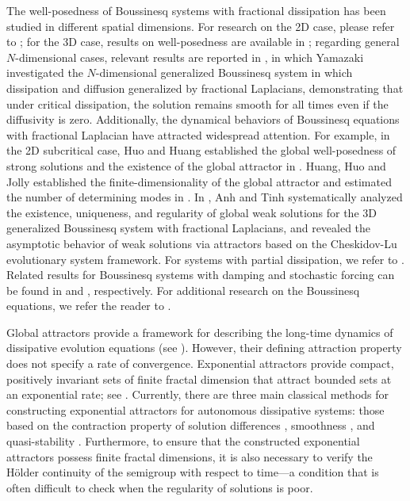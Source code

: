 \documentclass[oneside,preprint,12pt,numbers,sort&compress]{elsarticle}
\begin{document}
The well-posedness of Boussinesq systems with fractional
dissipation has been studied in different spatial dimensions. For research on the 2D case, please refer to \cite{YX2016,DYZ2020}; for the 3D case, results on well-posedness are available in \cite{BF2017,YJW2018,LY2021,XZ2024}; regarding general $N$-dimensional cases, relevant results are reported in \cite{Yamazaki2015}, in which Yamazaki investigated the $N$-dimensional generalized Boussinesq system in which dissipation and diffusion generalized by fractional Laplacians, demonstrating that under critical dissipation, the solution remains smooth for all times even if the diffusivity is zero. Additionally, the dynamical behaviors of Boussinesq equations with fractional Laplacian have attracted widespread attention. For example, in the 2D subcritical case, Huo and Huang established the global well-posedness of strong solutions and the existence of the global attractor in \cite{HH2016}. Huang, Huo and Jolly established the finite-dimensionality of the global attractor and estimated the number of determining modes in \cite{HHJ2018}. In \cite{AT2023}, Anh and Tinh systematically analyzed the existence, uniqueness, and regularity of global weak solutions for the 3D generalized Boussinesq system with fractional Laplacians, and revealed the asymptotic behavior of weak solutions via attractors based on the Cheskidov-Lu evolutionary system framework. For systems with partial dissipation, we refer to \cite{YJW2018,HS2020,HMS2022}. Related results for Boussinesq systems with damping and stochastic forcing can be found in \cite{LLX2022} and \cite{WH2024,ZCY2024}, respectively. For additional research on the Boussinesq equations, we refer the reader to \cite{XY2013,KC2014,JY2016,BF2017,Yue2023,WLCD2025,LLS2025,LSL2025}.

Global attractors provide a framework for describing the long-time dynamics of dissipative evolution equations (see \cite{Temam1997,CV2002}). However, their defining attraction property does not specify a rate of convergence. Exponential attractors provide compact, positively invariant sets of finite fractal dimension that attract bounded sets at an exponential rate; see \cite{EFNT1994}. Currently, there are three main classical methods for constructing exponential attractors for autonomous dissipative systems: those based on the contraction property of solution differences \cite{EFNT1994}, smoothness \cite{EMZ2000}, and quasi-stability \cite{Chueshov2015}. Furthermore, to ensure that the constructed exponential attractors possess finite fractal dimensions, it is also necessary to verify the Hölder continuity of the semigroup with respect to time—a condition that is often difficult to check when the regularity of solutions is poor.
\end{document}
